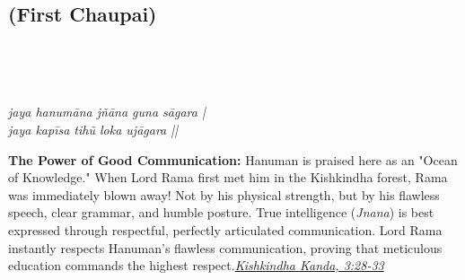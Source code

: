 \subsection*{ (First Chaupai)}

\begin{minipage}[t]{0.55\textwidth}
\vspace{0pt}

{\large \linespread{1.5}\selectfont
{}\\
\par}

\vspace{0.5em}

{\large \linespread{1.5}\selectfont
{}\\
\par}

\vspace{0.5em}

{\large \linespread{1.3}\selectfont
\textit{jaya hanumāna jñāna guna sāgara |}\\
\textit{jaya kapīsa tihũ loka ujāgara ||}
\par}
\end{minipage}%
\hfill
\begin{minipage}[t]{0.42\textwidth}
\vspace{0pt}
\begin{tcolorbox}[anchorbox]
\textbf{The Power of Good Communication:} Hanuman is praised here as an "Ocean of Knowledge." When Lord Rama first met him in the Kishkindha forest, Rama was immediately blown away! Not by his physical strength, but by his flawless speech, clear grammar, and humble posture. True intelligence (\textit{Jnana}) is best expressed through respectful, perfectly articulated communication.
\vspace{0.5em}\newline Lord Rama instantly respects Hanuman's flawless communication, proving that meticulous education commands the highest respect.\newline\null\hfill\href{https://www.valmiki.iitk.ac.in/sloka?field_kanda_tid=4&language=dv&field_sarga_value=3}{\textit{Kishkindha Kanda, 3:28-33}}
\end{tcolorbox}
\end{minipage}

